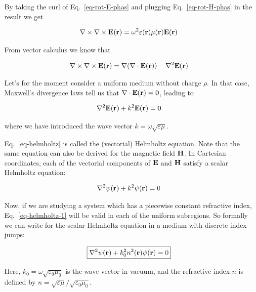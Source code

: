 By taking the curl of Eq.~\ref{eq-rot-E-phas} and plugging
Eq.~\ref{eq-rot-H-phas} in the result we get

\begin{equation}
\nabla \times \nabla \times {\bf E}({\bf r}) = \omega^2 \varepsilon({\bf r})
\mu({\bf r}) {\bf E}({\bf r}) 
\end{equation}

From vector calculus we know that

\begin{equation}
\nabla \times \nabla \times {\bf E}({\bf r}) = \nabla (\nabla \cdot {\bf E}({\bf
r})) - \nabla^2 {\bf E}({\bf r})
\end{equation}

Let's for the moment consider a uniform medium without charge $\rho$. In that
case, Maxwell's divergence laws tell us that $\nabla \cdot {\bf E}({\bf r})=0$,
leading to

\begin{equation}
\nabla^2 {\bf E}({\bf r}) + k^2 {\bf E}({\bf r}) = 0 \label{eq-helmholtz}
\end{equation}

where we have introduced the wave vector $k=\omega \sqrt{\varepsilon
\mu}$.

Eq.~\ref{eq-helmholtz} is called the (vectorial) Helmholtz equation. Note that
the same equation can also be derived for the magnetic field ${\bf H}$. In
Cartesian coordinates, each of the vectorial components of ${\bf E}$ and ${\bf
H}$ satisfy a scalar Helmholtz equation:

\begin{equation}
\nabla^2 \psi({\bf r}) + k^2 \psi({\bf r}) = 0 \label{eq-helmholtz-1}
\end{equation}

Now, if we are studying a system which has a piecewise constant refractive
index, Eq.~\ref{eq-helmholtz-1} will be valid in each of the uniform subregions.
So formally we can write for the scalar Helmholtz equation in a medium with
discrete index jumps:

\begin{equation}
\fbox{$\displaystyle
\nabla^2 \psi({\bf r}) + k_0^2 n^2({\bf r}) \psi({\bf r}) = 0
\label{eq-helmholtz-3}
$}
\end{equation}

Here, $k_0=\omega \sqrt{\varepsilon_0 \mu_0}$ is the wave vector in vacuum, and
the refractive index $n$ is defined by $n=\sqrt{\varepsilon \mu} /
\sqrt{\varepsilon_0 \mu_0}$.

